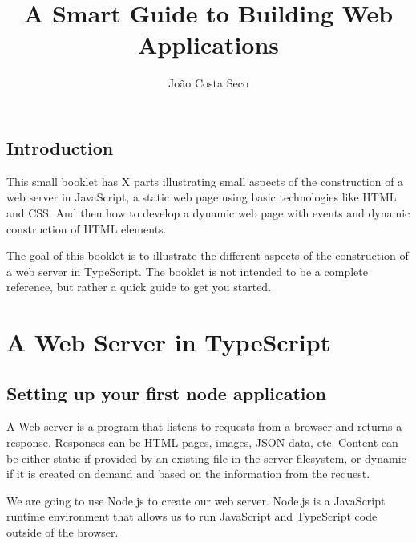 \documentclass[12pt,a5paper]{book}
\title{A Smart Guide to Building Web Applications}
\author{João Costa Seco}
\begin{document}
\maketitle

\chapter{Introduction}

This small booklet has X parts illustrating small aspects of the construction of
a web server in JavaScript, a static web page using basic technologies like HTML
and CSS. And then how to develop a dynamic web page with events and dynamic
construction of HTML elements. 

The goal of this booklet is to illustrate the different aspects of the
construction of a web server in TypeScript. The booklet is not intended to be a
complete reference, but rather a quick guide to get you started.

\part{A Web Server in TypeScript}

\chapter{Setting up your first node application}

A Web server is a program that listens to requests from a browser and returns a
response. Responses can be HTML pages, images, JSON data, etc. Content can be
either static if provided by an existing file in the server filesystem, or
dynamic if it is created on demand and based on the information from the request.

We are going to use Node.js to create our web server. Node.js is a JavaScript
runtime environment that allows us to run JavaScript and TypeScript code outside
of the browser.
\end{document}
